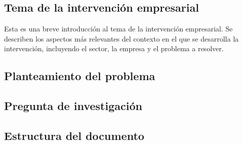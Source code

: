 \subsection*{Tema de la intervenci\'on empresarial}

Esta es una breve introducción al tema de la intervención empresarial. Se describen los aspectos más relevantes del contexto en el que se desarrolla la intervención, incluyendo el sector, la empresa y el problema a resolver.


\subsection*{Planteamiento del problema}
\subsection*{Pregunta de investigación}
\subsection*{Estructura del documento}